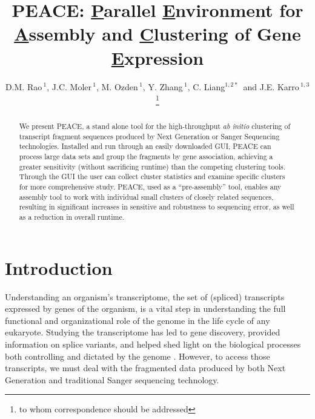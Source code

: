 \documentclass[a4,center,fleqn]{NAR}
\newcommand{\peace} {{\small PEACE}}
\begin{document}
\title{PEACE: {\underline P}arallel {\underline E}nvironment for {\underline A}ssembly
  and {\underline C}lustering of Gene {\underline E}xpression}

\author{D.M. Rao\,$^{1}$, J.C. Moler\,$^{1}$, M. Ozden\,$^1$, Y. Zhang\,$^{1}$,
  C. Liang$^{1,2*}$\, and J.E. Karro\,$^{1,3}$\footnote{to whom
    correspondence should be addressed}}

\address{$^1$ Department of Computer Science and Software Engineering, \\
  $^2$ Department of Botany, \\
  $^3$ and Department of Microbiology, Miami University, Oxford, Ohio,
  USA}




\maketitle

\begin{abstract}
  We present \peace, a stand alone tool for the high-throughput {\it
    ab initio} clustering of transcript fragment sequences produced by
  Next Generation or Sanger Sequencing technologies.  Installed and
  run through an easily downloaded GUI, \peace\/ can process large
  data sets and group the fragments by gene association, achieving a
  greater sensitivity (without sacrificing runtime) than the competing
  clustering tools.  Through the GUI the user can collect cluster
  statistics and examine specific clusters for more comprehensive
  study.  \peace\/, used as a ``pre-assembly'' tool, enables any
  assembly tool to work with individual small clusters of closely
  related sequences, resulting in significant increases in sensitive
  and robustness to sequencing error, as well as a reduction in
  overall runtime.
\end{abstract}


\section{Introduction}

Understanding an organism's transcriptome, the set of (spliced)
transcripts expressed by genes of the organism, is a vital step in
understanding the full functional and organizational role of the
genome in the life cycle of any eukaryote.  Studying the transcriptome
has led to gene discovery, provided information on splice variants,  
and helped shed light on the biological processes both controlling and
dictated by the genome \cite{Nagaraj07}.  However, to access those
transcripts, we must deal with the fragmented data produced by
both Next Generation and traditional Sanger sequencing technology.
\end{document}
